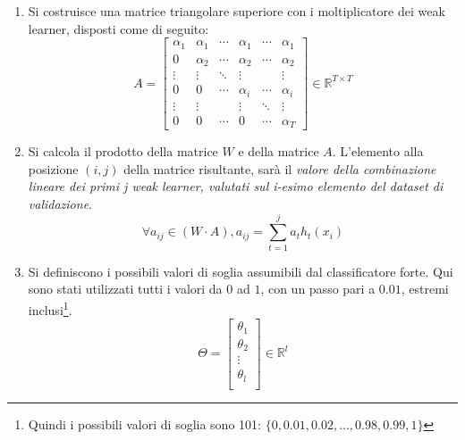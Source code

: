\begin{enumerate}
                \item Si costruisce una matrice triangolare superiore con i moltiplicatore dei weak learner, disposti come di seguito:
                \begin{equation}
                    \label{subeq:wl_multipliers_matrix}
                    A = \left[
                    \begin{array}{cccccc}
                        \alpha_1 & \alpha_1 & \cdots & \alpha_1 & \cdots & \alpha_1 \\
                        0 & \alpha_2 & \cdots & \alpha_2 & \cdots & \alpha_2 \\
                        \vdots & \vdots & \ddots & \vdots & & \vdots \\
                        0 & 0 & \cdots & \alpha_i & \cdots & \alpha_i \\
                        \vdots & \vdots & & \vdots  & \ddots & \vdots \\
                        0 & 0 & \cdots & 0 & \cdots & \alpha_T
                    \end{array}
                    \right] \in \mathbb{R}^{T \times T}
                \end{equation}

                \item Si calcola il prodotto della matrice $W$ e della matrice $A$. L'elemento alla posizione $(i,j)$ della matrice risultante, sarà il \emph{valore della combinazione lineare dei primi j weak learner, valutati sul i-esimo elemento del dataset di validazione}.
                \begin{equation}
                    \label{subeq:wca}
                    \forall a_{ij} \in (W \cdot A), 
                    a_{ij} = \sum_{t = 1}^{j} a_t h_t(x_i)
                \end{equation}

                \item Si definiscono i possibili valori di soglia assumibili dal classificatore forte. Qui sono stati utilizzati tutti i valori da $0$ ad $1$, con un passo pari a $0.01$, estremi inclusi\footnote{Quindi i possibili valori di soglia sono 101: $\{0, 0.01, 0.02, ..., 0.98, 0.99, 1\}$}.
                \begin{equation}
                    \label{subeq:thresholds_vector}
                    \Theta = \left[
                    \begin{array}{c}
                        \theta_1 \\
                        \theta_2 \\
                        \vdots \\
                        \theta_l \\
                    \end{array}
                    \right] \in \mathbb{R}^l
                \end{equation}


\end{enumerate}

